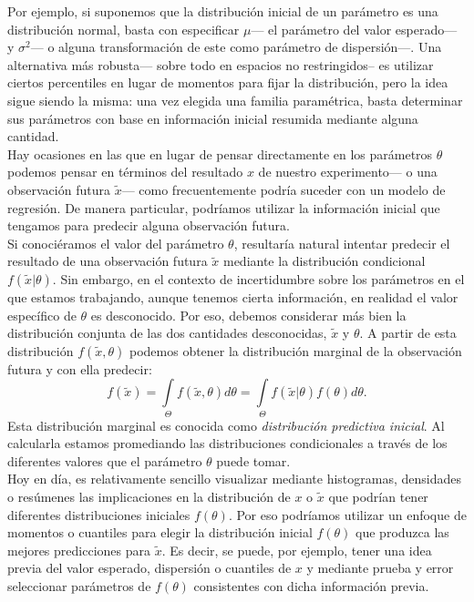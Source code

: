 Por ejemplo, si suponemos que la distribución inicial de un parámetro es una distribución normal, basta con especificar $\mu$--- el parámetro del valor esperado--- y $\sigma^2$--- o alguna transformación de este como parámetro de dispersión---. Una alternativa más robusta--- sobre todo en espacios no restringidos-- es utilizar ciertos percentiles en lugar de momentos para fijar la distribución, pero la idea sigue siendo la misma: una vez elegida una familia paramétrica, basta determinar sus parámetros con base en información inicial resumida mediante alguna cantidad.\\

Hay ocasiones en las que en lugar de pensar directamente en los parámetros $\theta$ podemos pensar en términos del resultado $x$ de nuestro experimento--- o una observación futura $\tilde{x}$--- como frecuentemente podría suceder con un modelo de regresión. De manera particular, podríamos utilizar la información inicial que tengamos para predecir alguna observación futura.\\ 

Si conociéramos el valor del parámetro $\theta$, resultaría natural intentar predecir el resultado de una observación futura $\tilde{x}$ mediante la distribución condicional $f(\tilde{x}|\theta)$. Sin embargo, en el contexto de incertidumbre sobre los parámetros en el que estamos trabajando, aunque tenemos cierta información, en realidad el valor específico de $\theta$ es desconocido. Por eso, debemos considerar más bien la distribución conjunta de las dos cantidades desconocidas, $\tilde{x}$ y $\theta$. A partir de esta distribución $f(\tilde{x},\theta)$ podemos obtener la distribución marginal de la observación futura y con ella predecir: 
\begin{equation*} 
f(\tilde{x})=\int\limits_\Theta f(\tilde{x},\theta)d\theta=\int\limits_\Theta f(\tilde{x}|\theta)f(\theta)d\theta.
\end{equation*}
Esta distribución marginal es conocida como \textit{distribución predictiva inicial}. Al calcularla estamos promediando las distribuciones condicionales a través de los diferentes valores que el parámetro $\theta$ puede tomar.\\

Hoy en día, es relativamente sencillo visualizar mediante histogramas, densidades o resúmenes las implicaciones en la distribución de $x$ o $\tilde{x}$ que podrían tener diferentes distribuciones iniciales $f(\theta)$. Por eso podríamos utilizar un enfoque de momentos o cuantiles para elegir la distribución inicial $f(\theta)$ que produzca las mejores predicciones para $\tilde{x}$. Es decir, se puede, por ejemplo, tener una idea previa del valor esperado, dispersión o cuantiles de $x$ y mediante prueba y error seleccionar parámetros de $f(\theta)$ consistentes con dicha información previa.\\

